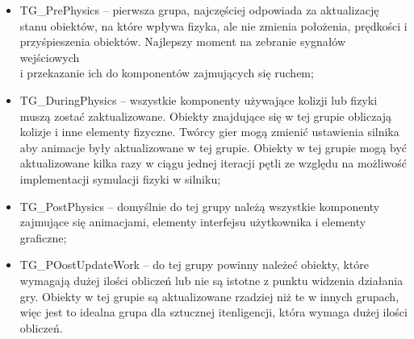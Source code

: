 \documentclass[12pt,twoside]{article}
\begin{document}
\begin{itemize}
    


\item TG\_PrePhysics – pierwsza grupa, najczęściej odpowiada za aktualizację
stanu obiektów, na które wpływa fizyka, ale nie zmienia położenia, prędkości i
przyśpieszenia obiektów. Najlepszy moment na zebranie sygnałów wejściowych\\i
przekazanie ich do komponentów zajmujących się ruchem;

\item TG\_DuringPhysics – wszystkie komponenty używające kolizji lub fizyki muszą
zostać zaktualizowane. Obiekty znajdujące się w tej grupie obliczają kolizje i
inne elementy fizyczne. Twórcy gier mogą zmienić ustawienia silnika aby animacje
były aktualizowane w tej grupie. Obiekty w tej grupie mogą być aktualizowane
kilka razy w ciągu jednej iteracji pętli ze względu na możliwość implementacji
symulacji fizyki w silniku; 

\item TG\_PostPhysics – domyślnie do tej grupy należą wszystkie komponenty
zajmujące się animacjami, elementy interfejsu użytkownika i elementy graficzne;

\item TG\_POostUpdateWork – do tej grupy powinny należeć obiekty, które wymagają
dużej ilości obliczeń lub nie są istotne z punktu widzenia działania gry.
Obiekty w tej grupie są aktualizowane rzadziej niż te w innych grupach, więc
jest to idealna grupa dla sztucznej itenligencji, która wymaga dużej ilości
obliczeń. 
\end{itemize}
\end{document}
